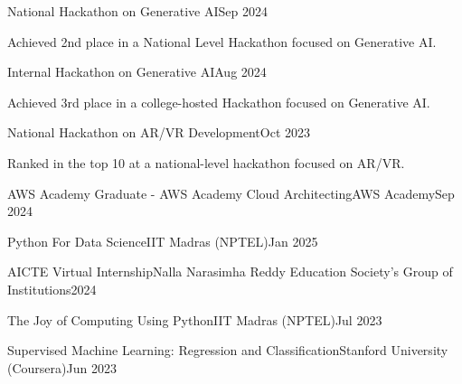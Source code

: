 \documentclass{professional_resume}
\begin{document}
\begin{rAward}{National Hackathon on Generative AI}{}{Sep 2024}
\item Achieved 2nd place in a National Level Hackathon focused on Generative AI.
\end{rAward}
\begin{rAward}{Internal Hackathon on Generative AI}{}{Aug 2024}
\item Achieved 3rd place in a college-hosted Hackathon focused on Generative AI.
\end{rAward}
\begin{rAward}{National Hackathon on AR/VR Development}{}{Oct 2023}
\item Ranked in the top 10 at a national-level hackathon focused on AR/VR.
\end{rAward}

\begin{rCertification}{AWS Academy Graduate - AWS Academy Cloud Architecting}{AWS Academy}{Sep 2024}
\end{rCertification}
\begin{rCertification}{Python For Data Science}{IIT Madras (NPTEL)}{Jan 2025}
\end{rCertification}
\begin{rCertification}{AICTE Virtual Internship}{Nalla Narasimha Reddy Education Society's Group of Institutions}{2024}
\end{rCertification}
\begin{rCertification}{The Joy of Computing Using Python}{IIT Madras (NPTEL)}{Jul 2023}
\end{rCertification}
\begin{rCertification}{Supervised Machine Learning: Regression and Classification}{Stanford University (Coursera)}{Jun 2023}
\end{rCertification}
\end{document}
